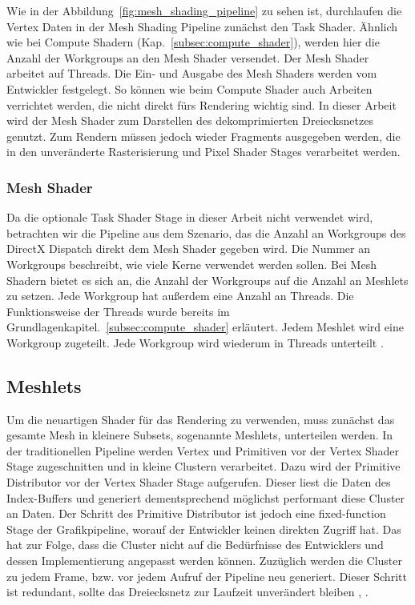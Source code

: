 Wie in der Abbildung~\ref{fig:mesh_shading_pipeline} zu sehen ist, durchlaufen die Vertex Daten in der Mesh Shading Pipeline zunächst den Task Shader.
Ähnlich wie bei Compute Shadern (Kap.~\ref{subsec:compute_shader}), werden hier die Anzahl der Workgroups an den Mesh Shader versendet.
Der Mesh Shader arbeitet auf Threads.
Die Ein- und Ausgabe des Mesh Shaders werden vom Entwickler festgelegt.
So können wie beim Compute Shader auch Arbeiten verrichtet werden, die nicht direkt fürs Rendering wichtig sind.
In dieser Arbeit wird der Mesh Shader zum Darstellen des dekomprimierten Dreiecksnetzes genutzt.
Zum Rendern müssen jedoch wieder Fragments ausgegeben werden, die in den unveränderte Rasterisierung und Pixel Shader Stages verarbeitet werden. \cite{Kubisch2018}

\subsubsection*{Mesh Shader}
Da die optionale Task Shader Stage in dieser Arbeit nicht verwendet wird, betrachten wir die Pipeline aus dem Szenario, das die Anzahl an Workgroups des DirectX Dispatch direkt dem Mesh Shader gegeben wird.
Die Nummer an Workgroups beschreibt, wie viele Kerne verwendet werden sollen.
Bei Mesh Shadern bietet es sich an, die Anzahl der Workgroups auf die Anzahl an Meshlets zu setzen.
Jede Workgroup hat außerdem eine Anzahl an Threads.
Die Funktionsweise der Threads wurde bereits im Grundlagenkapitel.~\ref{subsec:compute_shader} erläutert.
Jedem Meshlet wird eine Workgroup zugeteilt.
Jede Workgroup wird wiederum in Threads unterteilt \cite{Kubisch2018}.

\subsection{Meshlets}
\label{subsec:meshlets}
Um die neuartigen Shader für das Rendering zu verwenden, muss zunächst das gesamte Mesh in kleinere Subsets, sogenannte Meshlets, unterteilen werden. 
In der traditionellen Pipeline werden Vertex und Primitiven vor der Vertex Shader Stage zugeschnitten und in kleine Clustern verarbeitet.
Dazu wird der Primitive Distributor vor der Vertex Shader Stage aufgerufen.
Dieser liest die Daten des Index-Buffers und generiert dementsprechend möglichst performant diese Cluster an Daten.
Der Schritt des Primitive Distributor ist jedoch eine fixed-function Stage der Grafikpipeline, worauf der Entwickler keinen direkten Zugriff hat.
Das hat zur Folge, dass die Cluster nicht auf die Bedürfnisse des Entwicklers und dessen Implementierung angepasst werden können.
Zuzüglich werden die Cluster zu jedem Frame, bzw. vor jedem Aufruf der Pipeline neu generiert.
Dieser Schritt ist redundant, sollte das Dreiecksnetz zur Laufzeit unverändert bleiben \cite{Carvalho2022}, \cite{Kubisch2018}. \newline


